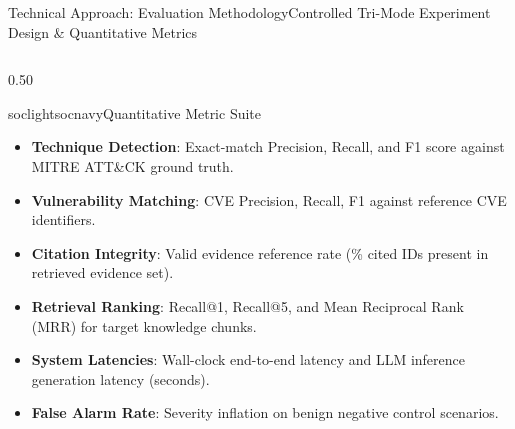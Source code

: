 \documentclass[aspectratio=169, 10pt]{beamer}
\begin{document}
\begin{frame}{Technical Approach: Evaluation Methodology}{Controlled Tri-Mode Experiment Design \& Quantitative Metrics}
\begin{columns}[T]
    \begin{column}{0.50\textwidth}
      \begin{cardbox}{soclight}{socnavy}{Quantitative Metric Suite}
        \begin{itemize}\setlength{\itemsep}{2pt}
          \item \textbf{Technique Detection}: Exact-match Precision, Recall, and F1 score against MITRE ATT\&CK ground truth.
          \item \textbf{Vulnerability Matching}: CVE Precision, Recall, F1 against reference CVE identifiers.
          \item \textbf{Citation Integrity}: Valid evidence reference rate (\% cited IDs present in retrieved evidence set).
          \item \textbf{Retrieval Ranking}: Recall@1, Recall@5, and Mean Reciprocal Rank (MRR) for target knowledge chunks.
          \item \textbf{System Latencies}: Wall-clock end-to-end latency and LLM inference generation latency (seconds).
          \item \textbf{False Alarm Rate}: Severity inflation on benign negative control scenarios.
        \end{itemize}
      \end{cardbox}
    \end{column}
  \end{columns}
\end{frame}
\end{document}
